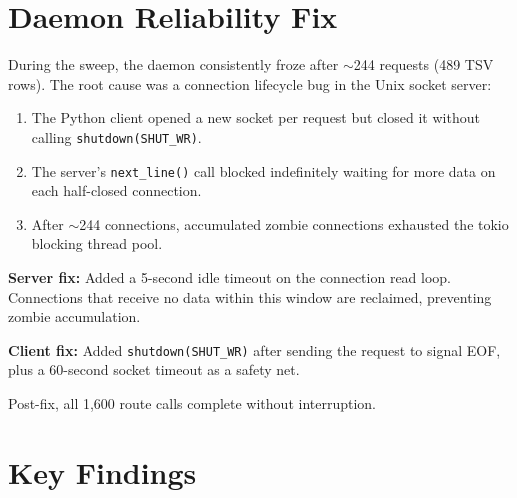 \documentclass[11pt,a4paper]{article}
\begin{document}
\section{Daemon Reliability Fix}

During the sweep, the daemon consistently froze after $\sim$244 requests (489 TSV rows).
The root cause was a connection lifecycle bug in the Unix socket server:

\begin{enumerate}[nosep]
    \item The Python client opened a new socket per request but closed it without calling \texttt{shutdown(SHUT\_WR)}.
    \item The server's \texttt{next\_line()} call blocked indefinitely waiting for more data on each half-closed connection.
    \item After $\sim$244 connections, accumulated zombie connections exhausted the tokio blocking thread pool.
\end{enumerate}

\textbf{Server fix:} Added a 5-second idle timeout on the connection read loop. Connections that receive no data within this window are reclaimed, preventing zombie accumulation.

\textbf{Client fix:} Added \texttt{shutdown(SHUT\_WR)} after sending the request to signal EOF, plus a 60-second socket timeout as a safety net.

Post-fix, all 1,600 route calls complete without interruption.

\section{Key Findings}
\end{document}

